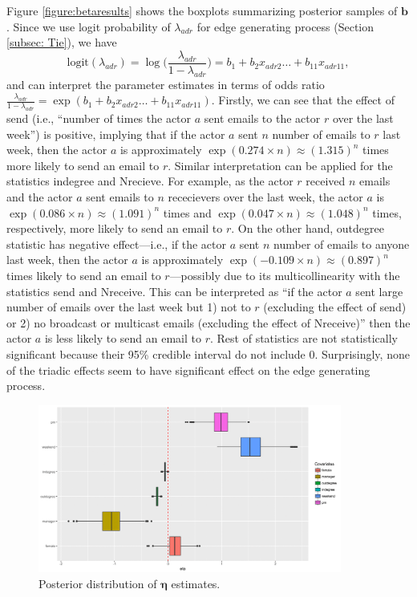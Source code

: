 \documentclass[12pt]{article}
\begin{document}
Figure \ref{figure:betaresults} shows the boxplots summarizing posterior samples of $\boldsymbol{b}$. Since we use logit probability of $\lambda_{adr}$ for edge generating process (Section \ref{subsec: Tie}), we have
\begin{equation*}
\mbox{logit}(\lambda_{adr})=\log\Big(\frac{\lambda_{adr}}{1-\lambda_{adr}}\Big) =b_{1}+b_{2} x_{adr2}\ldots+b_{11}x_{adr11},
\end{equation*}
and can interpret the parameter estimates in terms of odds ratio $\frac{\lambda_{adr}}{1-\lambda_{adr}}=\exp(b_{1}+b_{2} x_{adr2}\ldots+b_{11}x_{adr11})$.
Firstly, we can see that the effect of send (i.e., ``number of times the actor $a$ sent emails to the actor $r$ over the last week'') is positive, implying that if the actor $a$ sent $n$ number of emails to $r$ last week, then the actor $a$ is approximately $\exp(0.274\times n)\approx(1.315)^n$ times more likely to send an email to $r$. Similar interpretation can be applied for the statistics indegree and Nrecieve. For example, as the actor $r$ received $n$ emails and the actor $a$ sent emails to $n$ rececievers over the last week, the actor $a$ is $\exp(0.086\times n)\approx(1.091)^n $ times and $\exp(0.047\times n)\approx(1.048)^n$ times, respectively, more likely to send an email to $r$. On the other hand, outdegree statistic has negative effect---i.e., if the actor $a$ sent $n$ number of emails to anyone last week, then the actor $a$ is approximately $\exp(-0.109\times n)\approx(0.897)^n$ times likely to send an email to $r$---possibly due to its multicollinearity with the statistics send and Nreceive. This can be interpreted as ``if the actor $a$ sent large number of emails over the last week but 1) not to $r$ (excluding the effect of send) or 2) no broadcast or multicast emails (excluding the effect of Nreceive)'' then the actor $a$ is less likely to send an email to $r$. Rest of statistics are not statistically significant because their 95\% credible interval do not include 0. Surprisingly, none of the triadic effects seem to have significant effect on the edge generating process.
	\begin{figure}[!b]
		\centering
		\includegraphics[width=0.89\textwidth]{plots_paper/etaest-1.png}	
		\caption {Posterior distribution of $\boldsymbol{\eta}$ estimates.}
		\label{figure:etaresults}
	\end{figure}
\end{document}
